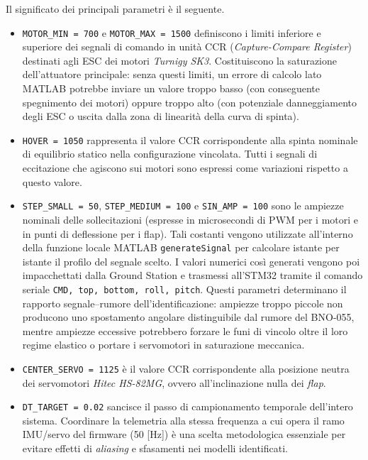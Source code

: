 \documentclass[11pt]{report}
\begin{document}
	Il significato dei principali parametri è il seguente.
	\begin{itemize}
		\item \texttt{MOTOR\_MIN = 700} e \texttt{MOTOR\_MAX = 1500} definiscono i limiti inferiore e superiore dei segnali di comando in unità CCR (\textit{Capture-Compare Register}) destinati agli ESC dei motori \textit{Turnigy SK3}. Costituiscono la saturazione dell'attuatore principale: senza questi limiti, un errore di calcolo lato MATLAB potrebbe inviare un valore troppo basso (con conseguente spegnimento dei motori) oppure troppo alto (con potenziale danneggiamento degli ESC o uscita dalla zona di linearità della curva di spinta).
		\item \texttt{HOVER = 1050} rappresenta il valore CCR corrispondente alla spinta nominale di equilibrio statico nella configurazione vincolata. Tutti i segnali di eccitazione che agiscono sui motori sono espressi come variazioni rispetto a questo valore.
		\item \texttt{STEP\_SMALL = 50}, \texttt{STEP\_MEDIUM = 100} e \texttt{SIN\_AMP = 100} sono le ampiezze nominali delle sollecitazioni (espresse in microsecondi di PWM per i motori e in punti di deflessione per i flap). Tali costanti vengono utilizzate all'interno della funzione locale MATLAB \texttt{generateSignal} per calcolare istante per istante il profilo del segnale scelto. I valori numerici così generati vengono poi impacchettati dalla Ground Station e trasmessi all'STM32 tramite il comando seriale \texttt{CMD, top, bottom, roll, pitch}. Questi parametri determinano il rapporto segnale--rumore dell'identificazione: ampiezze troppo piccole non producono uno spostamento angolare distinguibile dal rumore del BNO-055, mentre ampiezze eccessive potrebbero forzare le funi di vincolo oltre il loro regime elastico o portare i servomotori in saturazione meccanica.
		\item \texttt{CENTER\_SERVO = 1125} è il valore CCR corrispondente alla posizione neutra dei servomotori \textit{Hitec HS-82MG}, ovvero all'inclinazione nulla dei \textit{flap}.
		\item \texttt{DT\_TARGET = 0.02} sancisce il passo di campionamento temporale dell'intero sistema. Coordinare la telemetria alla stessa frequenza a cui opera il ramo IMU/servo del firmware (50 [Hz]) è una scelta metodologica essenziale per evitare effetti di \textit{aliasing} e sfasamenti nei modelli identificati.
	\end{itemize}
	
\end{document}
